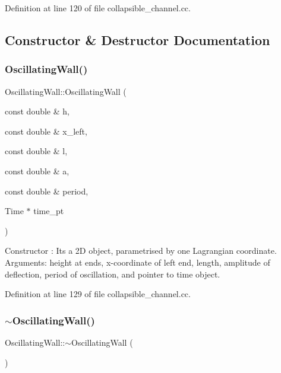 Definition at line 120 of file collapsible\+\_\+channel.\+cc.



\subsection{Constructor \& Destructor Documentation}
\mbox{\label{classOscillatingWall_a5ededc3d27eef5c4ef7e82ac5cdf6ff9}} 
\subsubsection{\texorpdfstring{Oscillating\+Wall()}{OscillatingWall()}\hspace{0.1cm}{\footnotesize\ttfamily [1/2]}}
{\footnotesize\ttfamily Oscillating\+Wall\+::\+Oscillating\+Wall (\begin{DoxyParamCaption}\item[{const double \&}]{h,  }\item[{const double \&}]{x\+\_\+left,  }\item[{const double \&}]{l,  }\item[{const double \&}]{a,  }\item[{const double \&}]{period,  }\item[{Time $\ast$}]{time\+\_\+pt }\end{DoxyParamCaption})\hspace{0.3cm}{\ttfamily [inline]}}



Constructor \+: It\textquotesingle{}s a 2D object, parametrised by one Lagrangian coordinate. Arguments\+: height at ends, x-\/coordinate of left end, length, amplitude of deflection, period of oscillation, and pointer to time object. 



Definition at line 129 of file collapsible\+\_\+channel.\+cc.

\mbox{\label{classOscillatingWall_adc35b40bdd733a244d6399d91fa20ade}} 
\subsubsection{\texorpdfstring{$\sim$\+Oscillating\+Wall()}{~OscillatingWall()}\hspace{0.1cm}{\footnotesize\ttfamily [1/2]}}
{\footnotesize\ttfamily Oscillating\+Wall\+::$\sim$\+Oscillating\+Wall (\begin{DoxyParamCaption}{ }\end{DoxyParamCaption})\hspace{0.3cm}{\ttfamily [inline]}}



